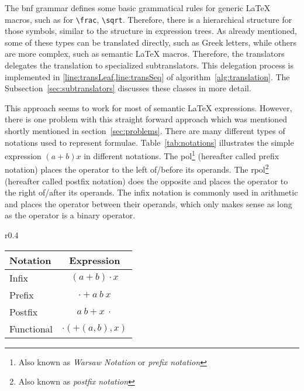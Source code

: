 The \gls*{bnf} grammar defines some basic grammatical rules for generic \LaTeX{} macros, such as for \verb|\frac|, \verb|\sqrt|. Therefore, there is a hierarchical structure for those symbols, similar to the structure in expression trees. As already mentioned, some of these types can be translated directly, such as Greek letters, while others are more complex, such as semantic \LaTeX{} macros. Therefore, the translators delegates the translation to specialized subtranslators. This delegation process is implemented in \cref{line:transLeaf,line:transSeq} of algorithm~\ref{alg:translation}. The Subsection~\ref{sec:subtranslators} discusses these classes in more detail.

This approach seems to work for most of semantic \LaTeX{} expressions. However, there is one problem with this straight forward approach which was mentioned shortly mentioned in section~\ref{sec:problems}. There are many different types of notations used to represent formulae. Table~\ref{tab:notations} illustrates the simple expression $(a+b)x$ in different notations. The \gls*{pol}\footnote{Also known as \textit{Warsaw Notation} or \textit{prefix notation}} (hereafter called prefix notation) places the operator to the left of/before its operands. The \gls*{rpol}\footnote{Also known as \textit{postfix notation}} (hereafter called postfix notation) does the opposite and places the operator to the right of/after its operands. The infix notation is commonly used in arithmetic and places the operator between their operands, which only makes sense as long as the operator is a binary operator.

\begin{wrapfigure}{r}{0.4\textwidth}
\vspace{-22pt}
\begin{minipage}{0.4\textwidth}
\center
\begin{tabular}{lc}
	\hline
	Notation & Expression \\
	\hline
	Infix & $(a+b) \cdot x$\\
	Prefix & $\cdot + a\ b\ x$\\
	Postfix & $a\ b + x\ \cdot$\\
	Functional & $\cdot(+(a, b), x)$\\
	\hline
\end{tabular}
\vspace{-5pt}
\caption{The mathematical expression '$(a+b) \cdot x$' in infix, prefix, postfix and functional notation.}
\label{tab:notations}
\end{minipage}
\vspace{-15pt}
\end{wrapfigure}

